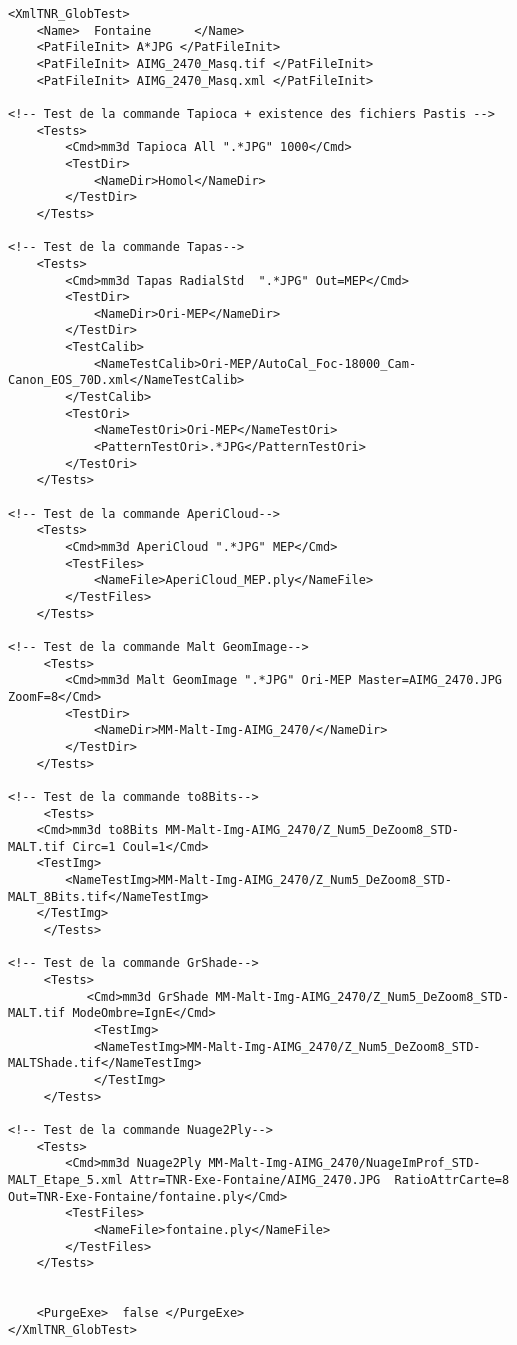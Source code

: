 \documentclass[a4paper]{book}
\begin{document}
\begin{lstlisting}
<XmlTNR_GlobTest>
	<Name>  Fontaine      </Name>  
	<PatFileInit> A*JPG </PatFileInit>
	<PatFileInit> AIMG_2470_Masq.tif </PatFileInit>
	<PatFileInit> AIMG_2470_Masq.xml </PatFileInit>
     
<!-- Test de la commande Tapioca + existence des fichiers Pastis -->
	<Tests>
		<Cmd>mm3d Tapioca All ".*JPG" 1000</Cmd>
		<TestDir>
			<NameDir>Homol</NameDir>
		</TestDir>
	</Tests>
     
<!-- Test de la commande Tapas-->
	<Tests>
		<Cmd>mm3d Tapas RadialStd  ".*JPG" Out=MEP</Cmd>
		<TestDir>
			<NameDir>Ori-MEP</NameDir>
		</TestDir>
		<TestCalib>
			<NameTestCalib>Ori-MEP/AutoCal_Foc-18000_Cam-Canon_EOS_70D.xml</NameTestCalib>
		</TestCalib>
		<TestOri>
			<NameTestOri>Ori-MEP</NameTestOri>
			<PatternTestOri>.*JPG</PatternTestOri>
		</TestOri>
	</Tests> 

<!-- Test de la commande AperiCloud-->
	<Tests>
		<Cmd>mm3d AperiCloud ".*JPG" MEP</Cmd>
		<TestFiles>
			<NameFile>AperiCloud_MEP.ply</NameFile>
		</TestFiles>
	</Tests>
     
<!-- Test de la commande Malt GeomImage-->
	 <Tests>
		<Cmd>mm3d Malt GeomImage ".*JPG" Ori-MEP Master=AIMG_2470.JPG ZoomF=8</Cmd>
		<TestDir>
			<NameDir>MM-Malt-Img-AIMG_2470/</NameDir>
		</TestDir>
	</Tests>
     
<!-- Test de la commande to8Bits-->
     <Tests>
	<Cmd>mm3d to8Bits MM-Malt-Img-AIMG_2470/Z_Num5_DeZoom8_STD-MALT.tif Circ=1 Coul=1</Cmd>
	<TestImg>
		<NameTestImg>MM-Malt-Img-AIMG_2470/Z_Num5_DeZoom8_STD-MALT_8Bits.tif</NameTestImg>
	</TestImg>
     </Tests>

<!-- Test de la commande GrShade-->
     <Tests>
           <Cmd>mm3d GrShade MM-Malt-Img-AIMG_2470/Z_Num5_DeZoom8_STD-MALT.tif ModeOmbre=IgnE</Cmd>
     		<TestImg>
			<NameTestImg>MM-Malt-Img-AIMG_2470/Z_Num5_DeZoom8_STD-MALTShade.tif</NameTestImg>
           	</TestImg>
     </Tests>

<!-- Test de la commande Nuage2Ply-->  
	<Tests>
		<Cmd>mm3d Nuage2Ply MM-Malt-Img-AIMG_2470/NuageImProf_STD-MALT_Etape_5.xml Attr=TNR-Exe-Fontaine/AIMG_2470.JPG  RatioAttrCarte=8 Out=TNR-Exe-Fontaine/fontaine.ply</Cmd>
		<TestFiles>
			<NameFile>fontaine.ply</NameFile>
		</TestFiles>
	</Tests>


	<PurgeExe>  false </PurgeExe>
</XmlTNR_GlobTest>
\end{lstlisting}
\end{document}
